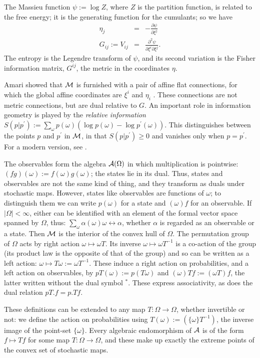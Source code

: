\documentclass[12pt]{article}
\begin{document}
The Massieu function $\psi:=\log Z$, where $Z$ is the partition function,
is related to the free energy; it is the generating function for
the cumulants; so we have
\begin{eqnarray}
\eta_j&=&-\frac{\partial \psi}{\partial \xi^j}\\
G_{ij}:=V_{ij}&=&\frac{\partial^2\psi}{\partial\xi^i\partial\xi^j}.
\end{eqnarray}
The entropy is the Legendre transform of $\psi$, and its second variation
is the Fisher information matrix, $G^{ij}$, the metric in the coordinates
$\eta$.

Amari showed that ${\cal M}$ is furnished with a pair of affine flat
connections, for which the global affine coordinates are $\xi^i$
and $\eta_i$ \cite{Amari}. These connections are not metric connections, but
are dual
relative to $G$. An important role in information geometry is played
by the {\em relative information} $S(p|p^\prime):=\sum_\omega p(\omega)
(\log p(\omega)-\log p^\prime(\omega))$. This distinguishes between the
points $p$ and $p^\prime$ in ${\cal M}$, in that $S(p|p^\prime)\geq 0$ and
vanishes only when $p=p^\prime$. For a modern version, see \cite{Pistone}.

The observables form the algebra ${\cal A}(\Omega)$ in which multiplication
is pointwise: $(fg)(\omega):=f(\omega)g(\omega)$; the states lie in
its dual. Thus, states and observables are not the same kind of thing,
and they transform as duals under stochastic maps.
However, states like observables are functions  of $\omega$; to distinguish
them we can write $p(\omega)$ for a state and
$(\omega)f$ for an
observable.  If $|\Omega|<\infty$, either can be identified with an element
of the formal vector space spanned by $\Omega$, thus: $\sum_\omega
\alpha(\omega)\omega\leftrightarrow\alpha$, whether $\alpha$ is regarded
as an observable or
a state. Then ${\cal M}$ is the interior of the convex hull of $\Omega$.
The permutation group of $\Omega$ acts by right action
$\omega\mapsto\omega T$. Its inverse $\omega\mapsto\omega T^{-1}$
is a co-action of the group (its product law is the opposite of that
of the group) and so can be written as a left action: $\omega\mapsto
T\omega:=\omega T^{-1}$. These induce a right action on probabilities,
and a left action on observables, by $pT(\omega):=p(T\omega)$ and
$(\omega)Tf:=(\omega T)f$, the latter written without the dual symbol $^*$.
These express associativity, as does the dual relation $pT.f=p.Tf$.

These definitions can be extended to any map $T:\Omega\rightarrow\Omega$,
whether invertible or not: we define the action on probabilities
using $T(\omega):=(\{\omega\}T^{-1})$, the inverse image of the point-set
$\{\omega\}$. Every algebraic
endomorphism of ${\cal A}$ is of the form $f\mapsto Tf$ for some map
$T:\Omega\rightarrow\Omega$, and these make up exactly
the extreme points of the convex set of stochastic maps.
\end{document}
